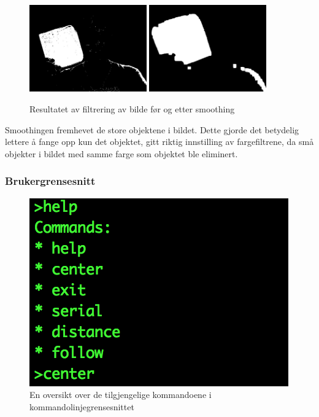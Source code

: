 \begin{figure}[!ht]
	\centering
	{\includegraphics[width=0.45\textwidth]{img/first-binary.jpg}}
	{\includegraphics[width=0.45\textwidth]{img/second-binary.jpg}}
	\caption{Resultatet av filtrering av bilde før og etter smoothing}
\end{figure}

Smoothingen fremhevet de store objektene i bildet. Dette gjorde det betydelig lettere å fange opp kun det objektet, gitt riktig innstilling av fargefiltrene, da små objekter i bildet med samme farge som objektet ble eliminert.

\newpage
\subsubsection{Brukergrensesnitt}

\begin{figure}
	\centering
	\includegraphics[width=\linewidth]{img/command-menu.png}
	\caption{En oversikt over de tilgjengelige kommandoene i kommandolinjegrensesnittet}
	\label{fig:commandmenu}
\end{figure}

